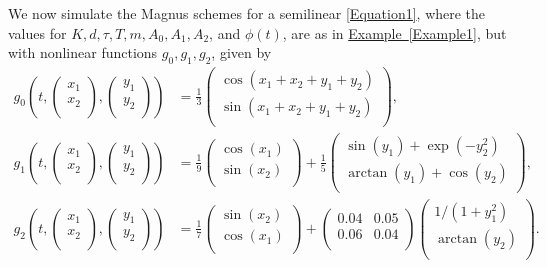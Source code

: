 \documentclass[onefignum]{siamart250211}
\begin{document}
\begin{example}\label{Example2} We now simulate the Magnus schemes for a semilinear \cref{Equation1}, where the values for $K,d,\tau,T,m,A_0,A_1,A_2$, and $\phi(t)$, are as in \hyperref[Example1]{Example~\ref*{Example1}}, but with nonlinear functions $g_0,g_1,g_2$, given by
\begin{align}
g_0\left(t,\begin{pmatrix}x_1\\x_2\\ \end{pmatrix},\begin{pmatrix}y_1\\y_2\\ \end{pmatrix}\right)&=\frac{1}{3}\begin{pmatrix}\cos(x_1+x_2+y_1+y_2) \\ \sin(x_1+x_2+y_1+y_2) \\ \end{pmatrix},\label{Example2Parameters}\\
g_1\left(t,\begin{pmatrix}x_1\\x_2\\ \end{pmatrix},\begin{pmatrix}y_1\\y_2\\ \end{pmatrix}\right)&=\frac{1}{9}\begin{pmatrix}\cos(x_1) \\ \sin(x_2) \\ \end{pmatrix}+\frac{1}{5}\begin{pmatrix}\sin(y_1)+\exp\left(-y_2^2\right) \\ \arctan(y_1)+\cos(y_2) \\ \end{pmatrix},\nonumber\\
g_2\left(t,\begin{pmatrix}x_1\\x_2\\ \end{pmatrix},\begin{pmatrix}y_1\\y_2\\ \end{pmatrix}\right)&=\frac{1}{7}\begin{pmatrix}\sin(x_2) \\ \cos(x_1) \\ \end{pmatrix}+\begin{pmatrix}0.04 & 0.05 \\0.06 & 0.04 \\ \end{pmatrix}\begin{pmatrix}1/\left(1+y_1^2\right) \\ \arctan(y_2) \\ \end{pmatrix}.\nonumber

\end{align}
\end{example}
\end{document}
